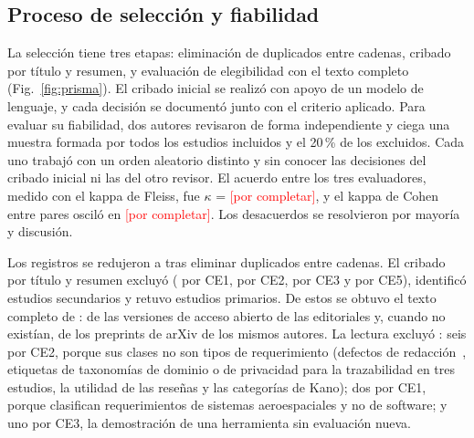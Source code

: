\documentclass[conference]{IEEEtran}
\newcommand{\pendiente}[1]{\textcolor{red}{[#1]}}
\newcommand{\kappaFleiss}{\pendiente{por completar}}
\newcommand{\kappaCohen}{\pendiente{por completar}}
\begin{document}
\subsection{Proceso de selección y fiabilidad}
La selección tiene tres etapas: eliminación de duplicados entre cadenas, cribado por título y resumen, y evaluación de elegibilidad con el texto completo (Fig.~\ref{fig:prisma}). El cribado inicial se realizó con apoyo de un modelo de lenguaje, y cada decisión se documentó junto con el criterio aplicado. Para evaluar su fiabilidad, dos autores revisaron de forma independiente y ciega una muestra formada por todos los estudios incluidos y el 20\,\% de los excluidos. Cada uno trabajó con un orden aleatorio distinto y sin conocer las decisiones del cribado inicial ni las del otro revisor. El acuerdo entre los tres evaluadores, medido con el kappa de Fleiss, fue $\kappa$ = \kappaFleiss, y el kappa de Cohen entre pares osciló en \kappaCohen. Los desacuerdos se resolvieron por mayoría y discusión.

Los \nIdent{} registros se redujeron a \nCrib{} tras eliminar \nDup{} duplicados entre cadenas. El cribado por título y resumen excluyó \nExclCrib{} (\nCEuno{} por CE1, \nCEdos{} por CE2, \nCEtres{} por CE3 y \nCEcinco{} por CE5), identificó \nSec{} estudios secundarios y retuvo \nBuscados{} estudios primarios. De estos se obtuvo el texto completo de \nRecuperados{}: de las versiones de acceso abierto de las editoriales y, cuando no existían, de los preprints de arXiv de los mismos autores. La lectura excluyó \nExclTC: seis por CE2, porque sus clases no son tipos de requerimiento (defectos de redacción~\cite{ElHajjami2025-Synthline}, etiquetas de taxonomías de dominio o de privacidad para la trazabilidad en tres estudios, la utilidad de las reseñas y las categorías de Kano); dos por CE1, porque clasifican requerimientos de sistemas aeroespaciales y no de software; y uno por CE3, la demostración de una herramienta sin evaluación nueva.
\end{document}
